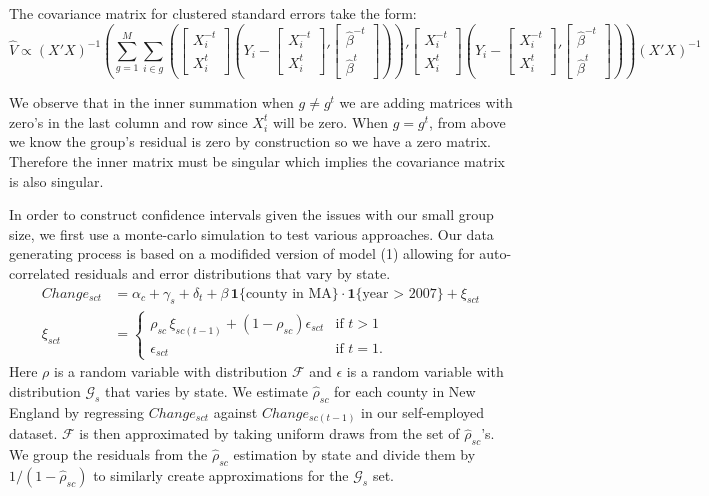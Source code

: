\documentclass[12pt]{article}
\begin{document}
The covariance matrix for clustered standard errors take the form:
$$ \hat{V} \propto (X'X)^{-1} \left( \sum_{g=1}^{M} \sum_{i \in g} \left(\begin{bmatrix}
X_i^{-t} \\  X_i^t 
\end{bmatrix}(Y_i - \begin{bmatrix}
X_i^{-t} \\  X_i^t 
\end{bmatrix}' \begin{bmatrix}
\hat{\beta}^{-t} \\ \hat{\beta}^t 
\end{bmatrix})\right)' \begin{bmatrix}
X_i^{-t} \\  X_i^t 
\end{bmatrix}(Y_i - \begin{bmatrix}
X_i^{-t} \\  X_i^t 
\end{bmatrix}' \begin{bmatrix}
\hat{\beta}^{-t} \\ \hat{\beta}^t 
\end{bmatrix})  \right)  (X'X)^{-1}$$ 

We observe that in the inner summation when $g \ne g^t$ we are adding matrices with zero's in the last column and row since $X^t_i$ will be zero. When $g = g^t$, from above we know the group's residual is zero by construction so we have a zero matrix. Therefore the inner matrix must be singular which implies the covariance matrix is also singular. 

In order to construct confidence intervals given the issues with our small group size, we first use a monte-carlo simulation to test various approaches. Our data generating process is based on a modifided version of model (1) allowing for auto-correlated residuals and error distributions that vary by state. 
\begin{align}
Change_{sct} & = \alpha_c + \gamma_s + \delta_t + \beta \, \mathbf{1}\{\text{county in MA}\} \cdot \mathbf{1}\{\text{year > 2007}\} + \xi_{sct} \\
\xi_{sct} & = 
\begin{cases}\rho_{sc} \, \xi_{sc(t-1)} + (1-\rho_{sc}) \epsilon_{sct} &\mbox{if } t > 1 \nonumber \\ 
\epsilon_{sct}  & \mbox{if } t = 1. \end{cases}
\end{align}
Here $\rho$ is a random variable with distribution $\mathcal{F}$ and $\epsilon$ is a random variable with distribution $\mathcal{G}_s$ that varies by state. We estimate $\hat{\rho}_{sc}$ for each county in New England by regressing $Change_{sct}$ against $Change_{sc(t-1)}$ in our self-employed dataset. $\mathcal{F}$ is then approximated by taking uniform draws from the set of $\hat{\rho}_{sc}$'s. We group the residuals from the $\hat{\rho}_{sc}$ estimation by state and divide them by $1/(1-\hat{\rho}_{sc})$ to similarly create approximations for the $\mathcal{G}_s$ set. 
\end{document}
